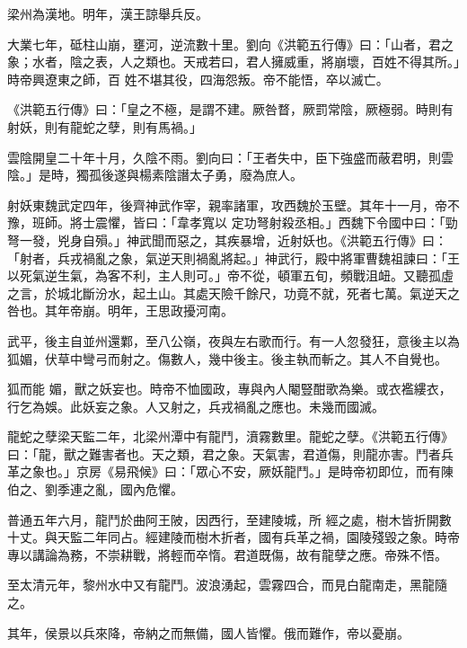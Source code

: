 \begin{pinyinscope}
 梁州為漢地。明年，漢王諒舉兵反。



 大業七年，砥柱山崩，壅河，逆流數十里。劉向《洪範五行傳》曰：「山者，君之象；水者，陰之表，人之類也。天戒若曰，君人擁威重，將崩壞，百姓不得其所。」時帝興遼東之師，百
 姓不堪其役，四海怨叛。帝不能悟，卒以滅亡。



 《洪範五行傳》曰：「皇之不極，是謂不建。厥咎瞀，厥罰常陰，厥極弱。時則有射妖，則有龍蛇之孽，則有馬禍。」



 雲陰開皇二十年十月，久陰不雨。劉向曰：「王者失中，臣下強盛而蔽君明，則雲陰。」是時，獨孤後遂與楊素陰譖太子勇，廢為庶人。



 射妖東魏武定四年，後齊神武作宰，親率諸軍，攻西魏於玉壁。其年十一月，帝不豫，班師。將士震懼，皆曰：「韋孝寬以
 定功弩射殺丞相。」西魏下令國中曰：「勁弩一發，兇身自殞。」神武聞而惡之，其疾暴增，近射妖也。《洪範五行傳》曰：「射者，兵戎禍亂之象，氣逆天則禍亂將起。」神武行，殿中將軍曹魏祖諫曰：「王以死氣逆生氣，為客不利，主人則可。」帝不從，頓軍五旬，頻戰沮衄。又聽孤虛之言，於城北斷汾水，起土山。其處天險千餘尺，功竟不就，死者七萬。氣逆天之咎也。其年帝崩。明年，王思政擾河南。



 武平，後主自並州還鄴，至八公嶺，夜與左右歌而行。有一人忽發狂，意後主以為狐媚，伏草中彎弓而射之。傷數人，幾中後主。後主執而斬之。其人不自覺也。



 狐而能
 媚，獸之妖妄也。時帝不恤國政，專與內人閹豎酣歌為樂。或衣襤縷衣，行乞為娛。此妖妄之象。人又射之，兵戎禍亂之應也。未幾而國滅。



 龍蛇之孽梁天監二年，北梁州潭中有龍鬥，濆霧數里。龍蛇之孽。《洪範五行傳》曰：「龍，獸之難害者也。天之類，君之象。天氣害，君道傷，則龍亦害。鬥者兵革之象也。」京房《易飛候》曰：「眾心不安，厥妖龍鬥。」是時帝初即位，而有陳伯之、劉季連之亂，國內危懼。



 普通五年六月，龍鬥於曲阿王陂，因西行，至建陵城，所
 經之處，樹木皆折開數十丈。與天監二年同占。經建陵而樹木折者，國有兵革之禍，園陵殘毀之象。時帝專以講論為務，不崇耕戰，將輕而卒惰。君道既傷，故有龍孽之應。帝殊不悟。



 至太清元年，黎州水中又有龍鬥。波浪湧起，雲霧四合，而見白龍南走，黑龍隨之。



 其年，侯景以兵來降，帝納之而無備，國人皆懼。俄而難作，帝以憂崩。




\end{pinyinscope}
